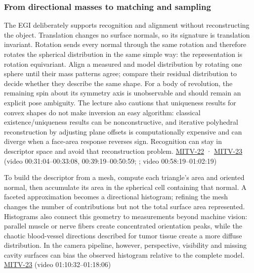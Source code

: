 \subsubsection{From directional masses to matching and sampling}\label{from-directional-masses-to-matching-and-sampling}

The EGI deliberately supports recognition and alignment without reconstructing the object. Translation changes no surface normals, so its signature is translation invariant. Rotation sends every normal through the same rotation and therefore rotates the spherical distribution in the same simple way: the representation is rotation equivariant. Align a measured and model distribution by rotating one sphere until their mass patterns agree; compare their residual distribution to decide whether they describe the same shape. For a body of revolution, the remaining spin about its symmetry axis is unobservable and should remain an explicit pose ambiguity. The lecture also cautions that uniqueness results for convex shapes do not make inversion an easy algorithm: classical existence/uniqueness results can be nonconstructive, and iterative polyhedral reconstruction by adjusting plane offsets is computationally expensive and can diverge when a face-area response reverses sign. Recognition can stay in descriptor space and avoid that reconstruction problem. \hyperref[04-visual-computing-ii-ch036]{MITV-22} · \hyperref[04-visual-computing-ii-ch036]{MITV-23} (video 00:31:04--00:33:08, 00:39:19--00:50:59; ; video 00:58:19--01:02:19)

To build the descriptor from a mesh, compute each triangle's area and oriented normal, then accumulate its area in the spherical cell containing that normal. A faceted approximation becomes a directional histogram; refining the mesh changes the number of contributions but not the total surface area represented. Histograms also connect this geometry to measurements beyond machine vision: parallel muscle or nerve fibers create concentrated orientation peaks, while the chaotic blood-vessel directions described for tumor tissue create a more diffuse distribution. In the camera pipeline, however, perspective, visibility and missing cavity surfaces can bias the observed histogram relative to the complete model. \hyperref[04-visual-computing-ii-ch036]{MITV-23} (video 01:10:32--01:18:06)

